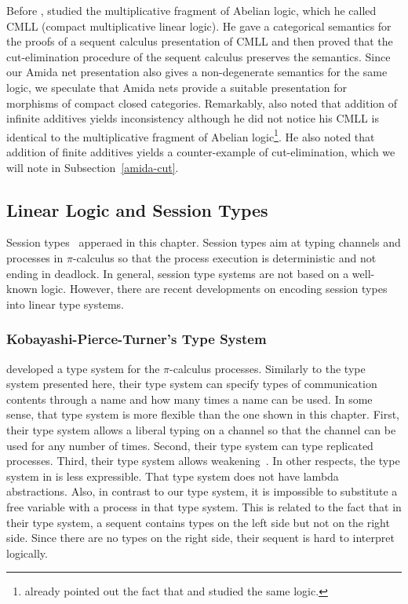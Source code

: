 Before \citet{metcalfe2002},
\citet{shirahata} studied the multiplicative fragment of Abelian logic,
which he called CMLL (compact multiplicative linear logic).
He gave a categorical semantics for the proofs of a sequent calculus
presentation of CMLL and then proved
that the cut-elimination procedure of
the sequent calculus preserves the semantics.
Since our Amida net presentation also gives a non-degenerate semantics
for the same logic, we speculate that Amida nets provide a suitable
presentation for morphisms of compact closed categories.
Remarkably,
\citet{shirahata} also noted that addition of infinite additives yields
inconsistency
although he did not notice his CMLL is identical to the multiplicative
fragment of Abelian logic\footnote{
\citet{expanding} already pointed out
the fact that \citet{shirahata} and
\citet{metcalfe2002} studied the same logic.}.
He also noted that addition of finite additives yields a counter-example
of cut-elimination, which we will note in Subsection~\ref{amida-cut}.

\subsection{Linear Logic and Session Types}

Session types~\citep{interaction,honda-session} apperaed in this chapter.
Session types aim at typing channels and processes in $\pi$-calculus so
that the process execution is deterministic and not ending in deadlock.
In general, session type systems are not based on a well-known logic.
However, there are recent developments on encoding session types into
linear type systems.

\subsubsection{Kobayashi-Pierce-Turner's Type System}

\citet{kobayashi-pierce-turner} developed a type system for the
$\pi$-calculus processes.
Similarly to the type system presented here,
their type system can specify
types of communication contents through a name and
how many times a name can be used.
In some sense,
that type system is more flexible than the one shown in this chapter.
First, their type system allows a liberal typing on a channel so
that the channel can be used for any number of times.
Second, their type system can type replicated processes.
Third, their type system allows
weakening~\citep[Lemma~3.2]{kobayashi-pierce-turner}.
In other respects,
the type system in \citep{kobayashi-pierce-turner} is less expressible.
That type system does not have lambda abstractions.
Also, in contrast to our type system,
it is impossible to substitute a free variable with a process in that
type system.
This is related to the fact that in their type system,
a sequent contains types on the left side but not on the right side.
Since there are no types on the right side, their sequent is hard to
interpret logically.

